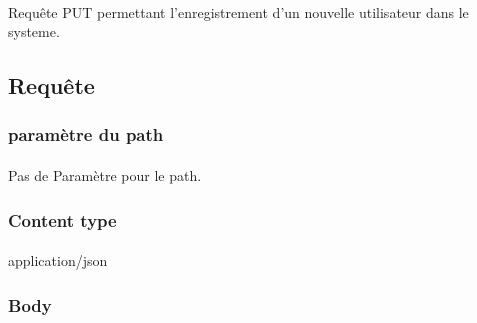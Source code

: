 \paragraph{}
	Requête PUT permettant l'enregistrement d'un nouvelle utilisateur dans le systeme.

\subsection{Requête}
	\subsubsection{paramètre du path}
		\paragraph{}
			Pas de Paramètre pour le path.
	
	\subsubsection{Content type}
		\paragraph{}
			application/json
			
	\subsubsection{Body}
